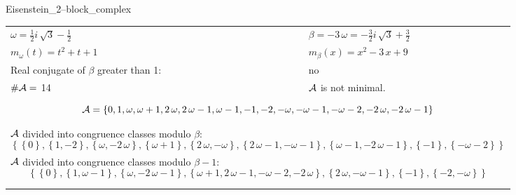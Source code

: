 \begin{exmp}
\label{ex:compareAC}

Eisenstein\_2--block\_complex

\rule{0cm}{0cm}

\begin{tabular}{ll}
$\omega=  \frac{1}{2} i \, \sqrt{3} - \frac{1}{2} $  & $\beta= -3 \, \omega = -\frac{3}{2} i \, \sqrt{3} + \frac{3}{2} $\\
$m_\omega(t)=  t^{2} + t + 1 $  & $m_\beta(x)=  x^{2} - 3 \, x + 9 $\\
Real conjugate of $\beta$ greater than 1:   &  no \\
$\#\mathcal{A}= $ 14 $ $ & $\mathcal{A}$ is not minimal. \\
\multicolumn{2}{l}{\begin{minipage}{\textwidth}\begin{dmath*}\A = \left\{0, 1, \omega, \omega + 1, 2 \, \omega, 2 \, \omega - 1, \omega - 1, -1, -2, -\omega, -\omega - 1, -\omega - 2, -2 \, \omega, -2 \, \omega - 1\right\}  \end{dmath*}\end{minipage} }\\
\multicolumn{2}{l}{\begin{minipage}{\textwidth}$\mathcal{A}$ divided into congruence classes modulo $\beta$: \begin{dmath*} \left\{\left\{0\right\}, \left\{1, -2\right\}, \left\{\omega, -2 \, \omega\right\}, \left\{\omega + 1\right\}, \left\{2 \, \omega, -\omega\right\}, \left\{2 \, \omega - 1, -\omega - 1\right\}, \left\{\omega - 1, -2 \, \omega - 1\right\}, \left\{-1\right\}, \left\{-\omega - 2\right\}\right\}  \end{dmath*}\end{minipage} }\\[10pt]
\multicolumn{2}{l}{\begin{minipage}{\textwidth}$\mathcal{A}$ divided into congruence classes modulo $\beta-1$: \begin{dmath*} \left\{\left\{0\right\}, \left\{1, \omega - 1\right\}, \left\{\omega, -2 \, \omega - 1\right\}, \left\{\omega + 1, 2 \, \omega - 1, -\omega - 2, -2 \, \omega\right\}, \left\{2 \, \omega, -\omega - 1\right\}, \left\{-1\right\}, \left\{-2, -\omega\right\}\right\}  \end{dmath*}\end{minipage} }\\
 & \\ \hline
 & \\
\end{tabular}


\end{exmp}
